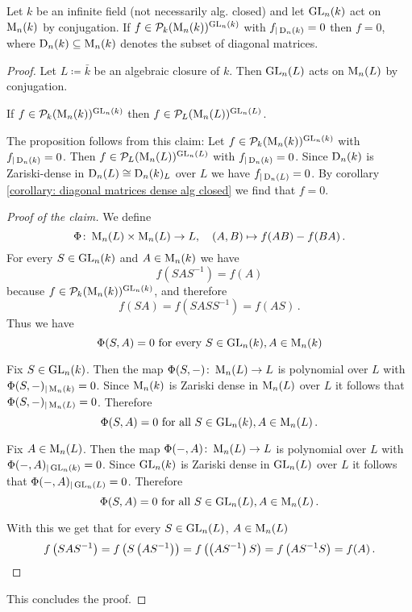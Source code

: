 \begin{proposition}
  Let $k$ be an infinite field (not necessarily alg. closed) and let $\operatorname{GL}_n(k)$ act on $\operatorname{M}_n(k)$ by conjugation.
  If $f \in \mathcal{P}_k(\operatorname{M}_n(k))^{\operatorname{GL}_n(k)}$ with $f_{|\operatorname{D}_n(k)} = 0$ then $f = 0$, where $\operatorname{D}_n(k) \subseteq \operatorname{M}_n(k)$ denotes the subset of diagonal matrices.
\end{proposition}
\begin{proof}
  Let $L \coloneqq \bar{k}$ be an algebraic closure of $k$.
  Then $\operatorname{GL}_n(L)$ acts on $\operatorname{M}_n(L)$ by conjugation.
  
  \begin{claim}
    If $f \in \mathcal{P}_k(\operatorname{M}_n(k))^{\operatorname{GL}_n(k)}$ then $f \in \mathcal{P}_L(\operatorname{M}_n(L))^{\operatorname{GL}_n(L)}$.
  \end{claim}
  
  The proposition follows from this claim:
  Let $f \in \mathcal{P}_k(\operatorname{M}_n(k))^{\operatorname{GL}_n(k)}$ with $f_{|\operatorname{D}_n(k)} = 0$.
  Then $f \in \mathcal{P}_L(\operatorname{M}_n(L))^{\operatorname{GL}_n(L)}$ with $f_{|\operatorname{D}_n(k)} = 0$.
  Since $\operatorname{D}_n(k)$ is Zariski-dense in $\operatorname{D}_n(L) \cong \operatorname{D}_n(k)_L$ over $L$ we have $f_{|\operatorname{D}_n(L)} = 0$.
  By corollary \ref{corollary: diagonal matrices dense alg closed} we find that $f = 0$.
  
  \begin{proof}[Proof of the claim]
    We define
    \[
              \Phi
      \colon  \operatorname{M}_n(L) \times \operatorname{M}_n(L)
      \to     L,
      \quad   (A,B)
      \mapsto f(AB)-f(BA) \,.
    \]
    For every $S \in \operatorname{GL}_n(k)$ and $A \in \operatorname{M}_n(k)$ we have
    \[
        f\left( SAS^{-1} \right)
      = f(A)
    \]
    because $f \in \mathcal{P}_k(\operatorname{M}_n(k))^{\operatorname{GL}_n(k)}$, and therefore
    \[
        f(SA)
      = f\left (SASS^{-1} \right)
      = f(AS) \,.
    \]
    Thus we have
    \[
        \Phi(S,A)
      = 0
      \text{ for every }
      S \in \operatorname{GL}_n(k),
      A \in \operatorname{M}_n(k)
    \]
    
    Fix $S \in \operatorname{GL}_n(k)$.
    Then the map $\Phi(S, -) \colon \operatorname{M}_n(L) \to L$ is polynomial over $L$ with $\Phi(S,-)_{|\operatorname{M}_n(k)} = 0$.
    Since $\operatorname{M}_n(k)$ is Zariski dense in $\operatorname{M}_n(L)$ over $L$ it follows that $\Phi(S,-)_{|\operatorname{M}_n(L)} = 0$.
    Therefore
    \[
        \Phi(S,A)
      = 0
      \text{ for all }
      S \in \operatorname{GL}_n(k),
      A \in \operatorname{M}_n(L) \,.
    \]
    
    Fix $A \in \operatorname{M}_n(L)$.
    Then the map $\Phi(-,A) \colon \operatorname{M}_n(L) \to L$ is polynomial over $L$ with $\Phi(-,A)_{|\operatorname{GL}_n(k)} = 0$.
    Since $\operatorname{GL}_n(k)$ is Zariski dense in $\operatorname{GL}_n(L)$ over $L$ it follows that $\Phi(-,A)_{|\operatorname{GL}_n(L)} = 0$.
    Therefore
    \[
        \Phi(S,A)
      = 0
      \text{ for all }
      S \in \operatorname{GL}_n(L),
      A \in \operatorname{M}_n(L) \,.
    \]
    
    With this we get that for every $S \in \operatorname{GL}_n(L)$, $A \in \operatorname{M}_n(L)$
    \[
        f\left( SAS^{-1} \right)
      = f\left( S \left( AS^{-1} \right) \right)
      = f\left( \left( AS^{-1} \right) S \right)
      = f\left( AS^{-1}S \right)
      = f(A) \,.
      \qedhere
    \]
  \end{proof}
  
  This concludes the proof.
\end{proof}





